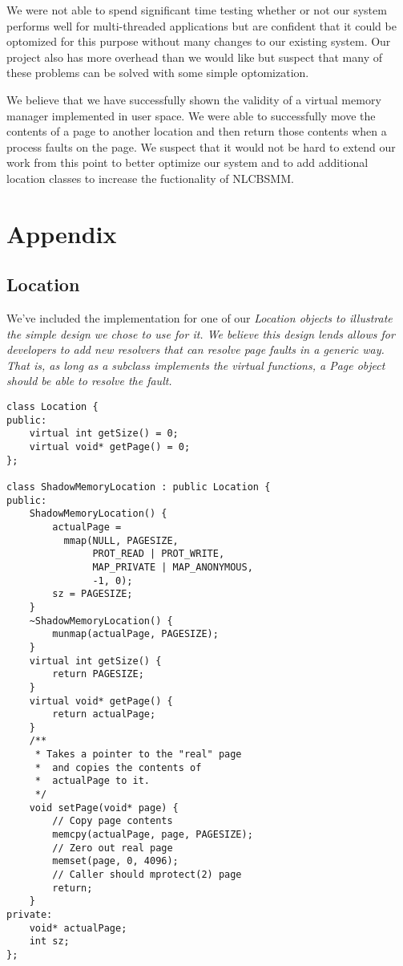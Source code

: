 \documentclass[9pt]{sig-alternate-10pt}
\begin{document}
We were not able to spend significant time testing whether or not our system performs well for multi-threaded applications but are confident that it could be optomized for this purpose without many changes to our existing system. Our project also has more overhead than we would like but suspect that many of these problems can be solved with some simple optomization. 

We believe that we have successfully shown the validity of a virtual memory manager implemented in user space. We were able to successfully move the contents of a page to another location and then return those contents when a process faults on the page. We suspect that it would not be hard to extend our work from this point to better optimize our system and to add additional location classes to increase the fuctionality of NLCBSMM.
\section{Appendix}
\subsection{Location}
\label{locationcode}
We've included the implementation for one of our \em Location \em objects to illustrate the simple design we chose to use for it.  We believe this design lends allows for developers to add new resolvers that can resolve page faults in a generic way.  That is, as long as a subclass implements the \em virtual \em functions, a Page object should be able to resolve the fault.

\begin{verbatim}
class Location {
public:
    virtual int getSize() = 0;
    virtual void* getPage() = 0;
};

class ShadowMemoryLocation : public Location {
public:
    ShadowMemoryLocation() {
        actualPage = 
          mmap(NULL, PAGESIZE, 
               PROT_READ | PROT_WRITE, 
               MAP_PRIVATE | MAP_ANONYMOUS, 
               -1, 0);
        sz = PAGESIZE;
    }
    ~ShadowMemoryLocation() {
        munmap(actualPage, PAGESIZE);
    }
    virtual int getSize() {
        return PAGESIZE;
    }
    virtual void* getPage() {
        return actualPage;
    }
    /**
     * Takes a pointer to the "real" page 
     *  and copies the contents of 
     *  actualPage to it.
     */
    void setPage(void* page) {
        // Copy page contents
        memcpy(actualPage, page, PAGESIZE);
        // Zero out real page
        memset(page, 0, 4096);
        // Caller should mprotect(2) page
        return;
    }
private:
    void* actualPage;
    int sz;
};
\end{verbatim}




\end{document}
